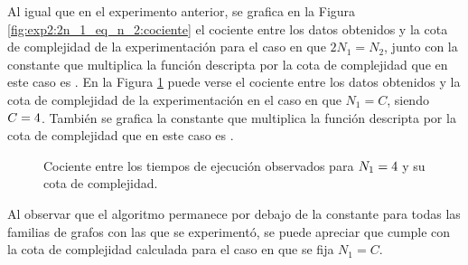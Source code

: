 Al igual que en el experimento anterior, se grafica en la Figura
\ref{fig:exp2:2n_1_eq_n_2:cociente} el cociente entre los datos obtenidos y la
cota de complejidad de la experimentación para el caso en que $2N_1 = N_2$,
junto con la constante que multiplica la función descripta por la cota de
complejidad que en este caso es \constante.
En la Figura \ref{fig:exp2:n_1_eq_fijo:cociente} puede verse el cociente entre
los datos obtenidos y la cota de complejidad de la experimentación en el caso
en que $N_1 = C$, siendo $C = 4$. También se grafica la constante que
multiplica la función descripta por la cota de complejidad que en este caso es
\constante.

\begin{figure}[H]
    \caption{Cociente entre los tiempos de ejecución observados para $N_1 = 4$ y su cota de complejidad.}
    \label{fig:exp2:n_1_eq_fijo:cociente}
    \centering
\end{figure}

Al observar que el algoritmo permanece por debajo de la constante para todas
las familias de grafos con las que se experimentó, se puede apreciar que
cumple con la cota de complejidad calculada para el caso en que se fija
$N_1 = C$.